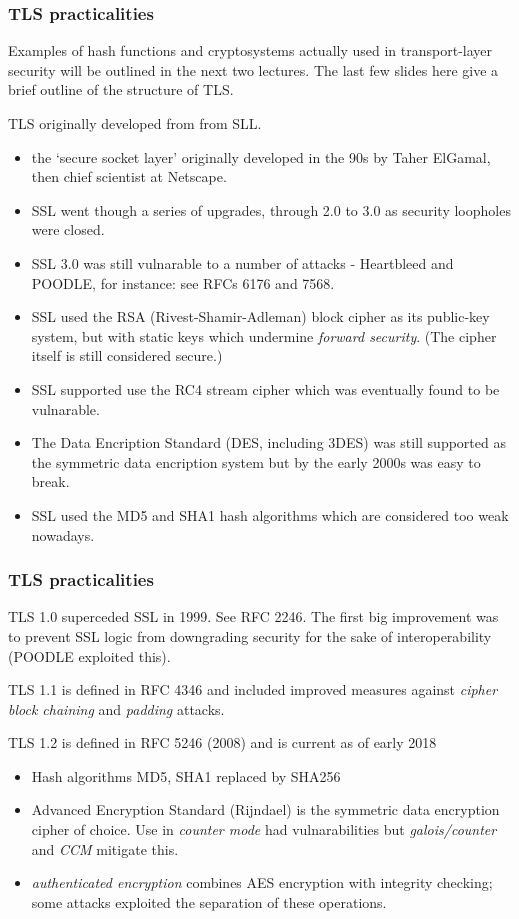 \documentclass[10pt, hyperref={pdfpagelabels=false}]{beamer}
\begin{document}
\begin{frame}
\frametitle{TLS practicalities}
Examples of hash functions and cryptosystems actually used in transport-layer security will be outlined in the next two lectures. The last few slides here give a brief outline of the structure of TLS.

TLS originally developed from from SLL.
\small
\begin{itemize} 
\item the `secure socket layer' originally developed in the 90s by Taher ElGamal, then chief scientist at Netscape.
\item SSL went though a series of upgrades, through 2.0 to 3.0 as security loopholes were closed.
\item SSL 3.0 was still vulnarable to a number of attacks - Heartbleed and POODLE, for instance: see RFCs 6176 and 7568.
\item SSL used the RSA (Rivest-Shamir-Adleman) block cipher as its public-key system, but with static keys which undermine \emph{forward security}. (The cipher itself is still considered secure.)
\item SSL supported use the RC4 stream cipher which was eventually found to be vulnarable.
\item The Data Encription Standard (DES, including 3DES) was still supported as the symmetric data encription system but by the early 2000s was easy to break.
\item SSL used the MD5 and SHA1 hash algorithms which are considered too weak nowadays.
\end{itemize}
\end{frame}

\begin{frame}
\frametitle{TLS practicalities}
TLS 1.0 superceded SSL in 1999. See RFC 2246. The first big improvement was to prevent SSL logic from downgrading security for the sake of interoperability (POODLE exploited this).

TLS 1.1 is defined in RFC 4346 and included improved measures against \emph{cipher block chaining} and \emph{padding} attacks.

TLS 1.2 is defined in RFC 5246 (2008) and is current as of early 2018
\begin{itemize}
\item Hash algorithms MD5, SHA1 replaced by SHA256
\item Advanced Encryption Standard (Rijndael) is the symmetric data encryption cipher of choice. Use in \emph{counter mode} had vulnarabilities but \emph{galois/counter} and \emph{CCM} mitigate this.
\item \emph{authenticated encryption} combines AES encryption with integrity checking; some attacks exploited the separation of these operations.
\end{itemize}  
\end{frame}
\end{document}
